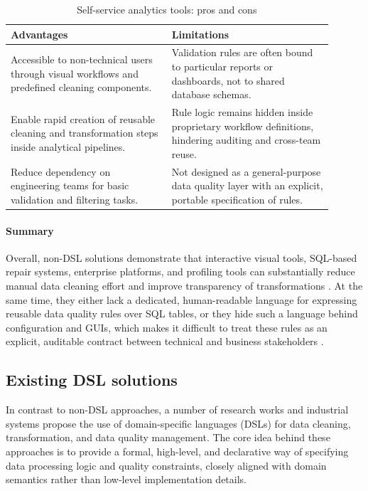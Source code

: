 \begin{table}[H]
\centering
\caption{Self-service analytics tools: pros and cons}
\begin{tabular}{|p{0.45\linewidth}| p{0.45\linewidth}|}
\hline
\textbf{Advantages} & \textbf{Limitations} \\
\hline
Accessible to non-technical users through visual workflows and predefined cleaning components. &
Validation rules are often bound to particular reports or dashboards, not to shared database schemas. \\
Enable rapid creation of reusable cleaning and transformation steps inside analytical pipelines. &
Rule logic remains hidden inside proprietary workflow definitions, hindering auditing and cross-team reuse. \\
Reduce dependency on engineering teams for basic validation and filtering tasks. &
Not designed as a general-purpose data quality layer with an explicit, portable specification of rules. \\
\hline
\end{tabular}
\end{table}

\FloatBarrier
\paragraph{Summary}
Overall, non-DSL solutions demonstrate that interactive visual tools, SQL-based repair systems, enterprise platforms, and profiling tools can substantially reduce manual data cleaning effort and improve transparency of transformations \cite{rahm2000data,wrangler,openrefine-site}. 
At the same time, they either lack a dedicated, human-readable language for expressing reusable data quality rules over SQL tables, or they hide such a language behind configuration and GUIs, which makes it difficult to treat these rules as an explicit, auditable contract between technical and business stakeholders \cite{falcon,quality-assessment-uml}.








\subsection{Existing DSL solutions}

In contrast to non-DSL approaches, a number of research works and industrial systems propose the use of domain-specific languages (DSLs) for data cleaning, transformation, and data quality management. 
The core idea behind these approaches is to provide a formal, high-level, and declarative way of specifying data processing logic and quality constraints, closely aligned with domain semantics rather than low-level implementation details.

